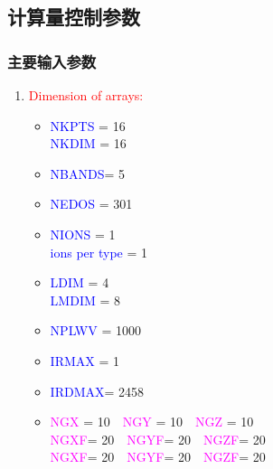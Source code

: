 \documentclass[cjk,slidestop,compress,mathserif,blue]{beamer}
\begin{document}
\subsection{计算量控制参数}
\frame
{
\frametitle{主要输入参数}
\begin{enumerate}
	\item \textcolor{red}{Dimension of arrays:}
	\begin{itemize}
		\item \textcolor{blue}{NKPTS} = 16~~\textcolor{brown}{\fontsize{9.2pt}{3.9pt}\selectfont{k-points}}\\
		\textcolor{blue}{NKDIM} = 16~~\textcolor{brown}{\fontsize{9.2pt}{3.9pt}\selectfont{k-points in BZ}}
		\item \textcolor{blue}{NBANDS}= 5~~\textcolor{brown}{\fontsize{9.2pt}{3.9pt}\selectfont{number of bands}}
		\item \textcolor{blue}{NEDOS} = 301~~\textcolor{brown}{\fontsize{9.2pt}{3.9pt}\selectfont{number of dos}}
		\item \textcolor{blue}{NIONS} = 1~~\textcolor{brown}{\fontsize{9.2pt}{3.9pt}\selectfont{number of ions}}\\
		\textcolor{blue}{ions per type}        =      1
		\item \textcolor{blue}{LDIM}  = 4~~\textcolor{brown}{\fontsize{9.2pt}{3.9pt}\selectfont{non local maximal}}\\
		\textcolor{blue}{LMDIM} = 8~~\textcolor{brown}{\fontsize{9.2pt}{3.9pt}\selectfont{non local SUM 2l+1}}
		\item \textcolor{blue}{NPLWV} = 1000~~\textcolor{brown}{\fontsize{9.2pt}{3.9pt}\selectfont{total plane-waves}}
		\item \textcolor{blue}{IRMAX} = 1~~\textcolor{brown}{\fontsize{9.2pt}{3.9pt}\selectfont{max r-space proj}}
		\item \textcolor{blue}{IRDMAX}= 2458~~\textcolor{brown}{\fontsize{9.2pt}{3.9pt}\selectfont{max aug-charges}}
		\item \textcolor{magenta}{NGX} =  10~~\textcolor{magenta}{NGY} = 10~~\textcolor{magenta}{NGZ} = 10~~\textcolor{brown}{\fontsize{9.2pt}{3.9pt}\selectfont{dimension x,y,z}}\\
		\textcolor{magenta}{NGXF}= 20~~\textcolor{magenta}{NGYF}= 20~~\textcolor{magenta}{NGZF}= 20~~\textcolor{brown}{\fontsize{9.2pt}{3.9pt}\selectfont{dimension x,y,z}}\\
		\textcolor{magenta}{NGXF}= 20~~\textcolor{magenta}{NGYF}= 20~~\textcolor{magenta}{NGZF}= 20~~\textcolor{brown}{\fontsize{9.2pt}{3.9pt}\selectfont{support grid}}
	\end{itemize}
\end{enumerate}
}
\end{document}
